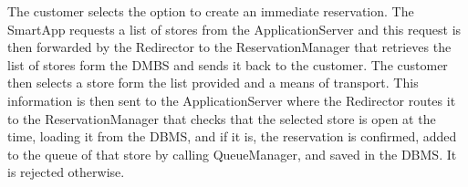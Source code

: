 The customer selects the option to create an immediate reservation. The SmartApp requests a list of stores from the ApplicationServer and this request is then forwarded by the Redirector to the ReservationManager that retrieves the list of stores form the DMBS and sends it back to the customer. The customer then selects a store form the list provided and a means of transport. This information is then sent to the ApplicationServer where the Redirector routes it to the ReservationManager that checks that the selected store is open at the time, loading it from the DBMS, and if it is, the reservation is confirmed, added to the queue of that store by calling QueueManager, and saved in the DBMS. It is rejected otherwise.


